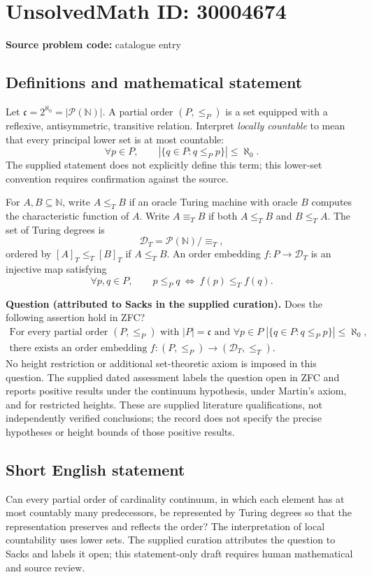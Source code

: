\documentclass[11pt]{article}
\newcommand{\N}{\mathbb{N}}
\begin{document}
\section*{UnsolvedMath ID: 30004674}
\textbf{Source problem code:} catalogue entry
\subsection{Definitions and mathematical statement}
Let \(\mathfrak c=2^{\aleph_0}=|\mathcal P(\N)|\). A partial order \((P,\leq_P)\) is a set equipped with a reflexive, antisymmetric, transitive relation. Interpret \emph{locally countable} to mean that every principal lower set is at most countable:
\[
\forall p\in P,\qquad |\{q\in P:q\leq_P p\}|\leq\aleph_0.
\]
The supplied statement does not explicitly define this term; this lower-set convention requires confirmation against the source.

For \(A,B\subseteq\N\), write \(A\leq_T B\) if an oracle Turing machine with oracle \(B\) computes the characteristic function of \(A\). Write \(A\equiv_T B\) if both \(A\leq_T B\) and \(B\leq_T A\). The set of Turing degrees is
\[
\mathcal D_T=\mathcal P(\N)/{\equiv_T},
\]
ordered by \([A]_T\leq_T[B]_T\) if \(A\leq_T B\). An order embedding \(f:P\to\mathcal D_T\) is an injective map satisfying
\[
\forall p,q\in P,\qquad p\leq_P q\ \Longleftrightarrow\ f(p)\leq_T f(q).
\]

\textbf{Question (attributed to Sacks in the supplied curation).} Does the following assertion hold in ZFC?
\[
\begin{gathered}
\text{For every partial order }(P,\leq_P)\text{ with }|P|=\mathfrak c
\text{ and }\forall p\in P\;
|\{q\in P:q\leq_P p\}|\leq\aleph_0,\\
\text{there exists an order embedding }f:(P,\leq_P)\longrightarrow(\mathcal D_T,\leq_T).
\end{gathered}
\]
No height restriction or additional set-theoretic axiom is imposed in this question. The supplied dated assessment labels the question open in ZFC and reports positive results under the continuum hypothesis, under Martin's axiom, and for restricted heights. These are supplied literature qualifications, not independently verified conclusions; the record does not specify the precise hypotheses or height bounds of those positive results.
\subsection{Short English statement}
Can every partial order of cardinality continuum, in which each element has at most countably many predecessors, be represented by Turing degrees so that the representation preserves and reflects the order? The interpretation of local countability uses lower sets. The supplied curation attributes the question to Sacks and labels it open; this statement-only draft requires human mathematical and source review.
\end{document}
